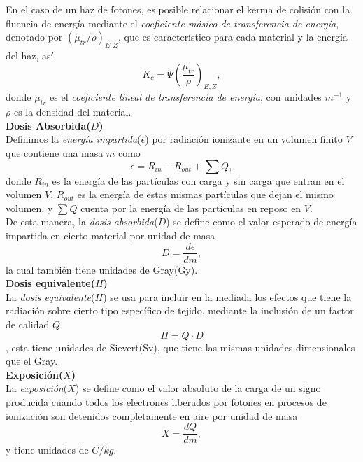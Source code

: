En el caso de un haz de fotones, es posible relacionar el kerma de colisión con la fluencia de energía mediante el \textit{coeficiente másico de transferencia de energía}, denotado por $(\mu_{tr}/\rho)_{E,Z}$, que es característico para cada material y la energía del haz, así
\begin{equation}
K_c=\Psi \left(\frac{\mu_{tr}}{\rho}\right)_{E,Z},
\end{equation} 
donde $\mu_{tr}$ es el \textit{coeficiente lineal de transferencia de energía}, con unidades $m^{-1}$ y $\rho$ es la densidad del material.\\

\noindent
\textbf{Dosis Absorbida($D$)}\\

Definimos la \textit{energía impartida}($\epsilon$) por radiación ionizante en un volumen finito $V$ que contiene una masa $m$ como
\begin{equation}
	\epsilon =R_{in}-R_{out}+\sum Q,
\end{equation}
donde $R_{in}$ es la energía de las partículas con carga y sin carga que entran en el volumen $V$, $R_{out}$ es la energía de estas mismas partículas que dejan el mismo volumen, y $\sum Q$ cuenta por la energía de las partículas en reposo en $V$.\\

De esta manera, la \textit{dosis absorbida}($D$) se define como el valor esperado de energía impartida en cierto material por unidad de masa
\begin{equation}
D=\frac{d\epsilon}{dm},
\end{equation}
la cual también tiene unidades de Gray(Gy).\\

\noindent
\textbf{Dosis equivalente($H$)}\\

La \textit{dosis equivalente}($H$) se usa para incluir en la mediada los efectos que tiene la radiación sobre cierto tipo específico de tejido, mediante la inclusión de un factor de calidad $Q$
\begin{equation}
H=Q\cdot D
\end{equation},
esta tiene unidades de Sievert(Sv), que tiene las mismas unidades dimensionales que el Gray.\\

\noindent
\textbf{Exposición($X$)}\\

La \textit{exposición}($X$) se define como el valor absoluto de la carga de un signo producida cuando todos los electrones liberados por fotones en procesos de ionización son detenidos completamente en aire por unidad de masa
\begin{equation}
X=\frac{dQ}{dm},
\end{equation}
y tiene unidades de $C/kg$.
